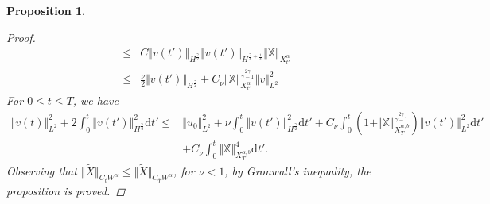 \documentclass{article}
\newtheorem{proposition}{Proposition}[section]
\numberwithin{equation}{section}
\newcommand{\m}{\mathbb}
\begin{document}
\begin{proposition}
\begin{proof}
\begin{align*}
             \leq& C\Vert v(t')\Vert_{H^{\frac\gamma2}}\Vert v(t')\Vert_{H^{\frac\gamma4+\frac
             14}}\Vert \m X\Vert_{X_{t'}^\alpha}\\
             \leq&\frac{\nu}{2} \Vert v(t')\Vert_{H^{\frac\gamma2}}+C_\nu\Vert \m X\Vert_{X_{t'}^\alpha}^{\frac{2\gamma}{\gamma-1}}\Vert v\Vert_{L^2}^2
         \end{align*}
			For $0\leq t\leq T$, we have 
			\begin{equation}
				\begin{aligned}
					\Vert v(t)\Vert_{L^2}^2+2\int_0^t \Vert v(t')\Vert_{H^\frac{\gamma}{2}}^2\mathrm{d}t'\leq& \Vert u_0\Vert_{L^2}^2+\nu \int_0^t \Vert v(t')\Vert_{H^\frac{\gamma}{2}}^2\mathrm{d}t'+C_\nu\int_0^t (1+\Vert \m X\Vert_{X_T^{\alpha,b}}^{\frac{2\gamma}{\gamma-1}})\Vert v(t')\Vert_{L^2}^2\mathrm{d}t'\\
					&+C_\nu\int_0^t\Vert \m X\Vert_{X_T^{\alpha,b}}^4\mathrm{d}t'.	
				\end{aligned}
			\end{equation}
			Observing that $\Vert\tilde X\Vert_{C_tW^\alpha}\leq \Vert \tilde X\Vert_{C_{\bar T}W^\alpha}$, for $\nu<1$, by Gronwall's inequality, the proposition is proved.
		\end{proof}
	
\end{proposition}
\end{document}
